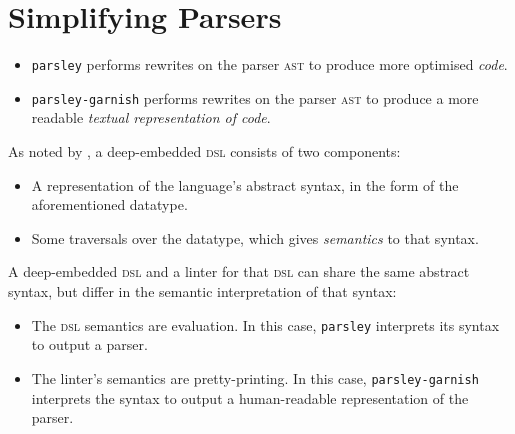\documentclass[../../../main.tex]{subfiles}
\begin{document}
\section{Simplifying Parsers}\label{sec:simplify-parsers}


\begin{itemize}
  \item \texttt{parsley} performs rewrites on the parser \textsc{ast} to produce more optimised \emph{code}.
  \item \texttt{parsley-garnish} performs rewrites on the parser \textsc{ast} to produce a more readable \emph{textual representation of code}.
\end{itemize}

As noted by \textcite{gibbons_dsls_2014}, a deep-embedded \textsc{dsl} consists of two components:
\begin{itemize}
  \item A representation of the language's abstract syntax, in the form of the aforementioned datatype.
  \item Some traversals over the datatype, which gives \emph{semantics} to that syntax.
\end{itemize}
A deep-embedded \textsc{dsl} and a linter for that \textsc{dsl} can share the same abstract syntax, but differ in the semantic interpretation of that syntax:
\begin{itemize}
  \item The \textsc{dsl} semantics are evaluation. In this case, \texttt{parsley} interprets its syntax to output a parser.
  \item The linter's semantics are pretty-printing. In this case, \texttt{parsley-garnish} interprets the syntax to output a human-readable representation of the parser.
\end{itemize}
\end{document}
